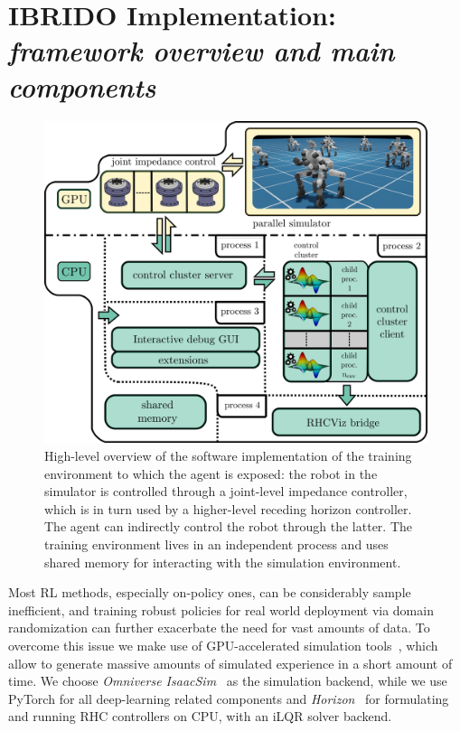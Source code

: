 \section{IBRIDO Implementation: \textnormal{\textit{framework overview and main components}}}
\begin{figure}[t]
	\centering
	\includegraphics[width=0.85\columnwidth]{imgs/cocluster_arch.pdf}
	\caption{High-level overview of the software implementation of the training environment to which the agent is exposed: the robot in the simulator is controlled through a joint-level impedance controller, which is in turn used by a higher-level receding horizon controller. The agent can indirectly control the robot through the latter. The training environment lives in an independent process and uses shared memory for interacting with the simulation environment.}
	\label{fig:coclbridge_arch}
	\vspace{-0.3cm}
\end{figure}
Most RL methods, especially on-policy ones, can be considerably sample inefficient, and training robust policies for real world deployment via domain randomization can further exacerbate the need for vast amounts of data. To overcome this issue we make use of GPU-accelerated simulation tools~\cite{web::isaacsim,rl:mujocoaccelereted2023}, which allow to generate massive amounts of simulated experience in a short amount of time. We choose \textit{Omniverse IsaacSim}~\cite{web::isaacsim} as the simulation backend, while we use PyTorch for all deep-learning related components and  \textit{Horizon}~\cite{frameworks::horizon_to} for formulating and running RHC controllers on CPU, with an iLQR solver backend.
